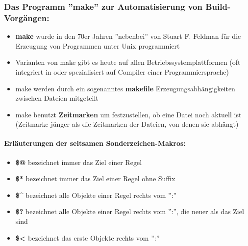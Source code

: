 \subsubsection{Das Programm ''make'' zur Automatisierung von Build-Vorgängen:}
\begin{itemize}
	\item \textbf{make} wurde in den 70er Jahren ''nebenbei'' von Stuart F. Feldman für die Erzeugung von Programmen unter Unix programmiert
	\item Varianten von make gibt es heute auf allen Betriebssystemplattformen (oft integriert in oder spezialisiert auf Compiler einer Programmiersprache) 
	\item make werden durch ein sogenanntes \textbf{makefile} Erzeugungsabhängigkeiten zwischen Dateien mitgeteilt
	\item make benutzt \textbf{Zeitmarken} um festzustellen, ob eine Datei noch aktuell ist (Zeitmarke jünger als die Zeitmarken der Dateien, von denen sie abhängt)
\end{itemize}
\paragraph{Erläuterungen der seltsamen Sonderzeichen-Makros:}
\begin{itemize}
	\item \textbf{\$@} bezeichnet immer das Ziel einer Regel
	\item \textbf{\$*} bezeichnet immer das Ziel einer Regel ohne Suffix
	\item \textbf{\$\^} bezeichnet alle Objekte einer Regel rechts vom '':''
	\item \textbf{\$?} bezeichnet alle Objekte einer Regel rechts vom '':'', die neuer als das Ziel sind
	\item \textbf{\$<} bezeichnet das erste Objekte rechts vom '':''
\end{itemize}
